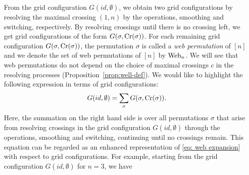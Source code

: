 From the grid configuration $G(id, \emptyset)$, we obtain two grid
configurations by resolving the maximal crossing \( (1,n) \)
by the operations, smoothing and switching, respectively.
By resolving crossings until there is no crossing left,
we get grid configurations of the form $G(\sigma, \operatorname{Cr}(\sigma))$.
For each remaining grid configuration $G(\sigma, \operatorname{Cr}(\sigma))$,
the permutation $\sigma$ is called a \emph{web permutation} of $[n]$ and
we denote the set of web permutations of $[n]$ by $\operatorname{Web}_n$.
We will see that web permutations do not depend on the choice of maximal
crossings \( c \) in the resolving processes (Proposition~\ref{prop:well-def}).
We would like to highlight the following expression in terms of grid configurations:
\begin{equation}\label{Equation: empty grid=sum of grid}
G(id, \emptyset) = \sum_{\sigma} G(\sigma, \operatorname{Cr}(\sigma)).
\end{equation}
Here, the summation on the right hand side is over all permutations $\sigma$ that arise from resolving crossings in the grid configuration $G(id, \emptyset)$ through the operations, smoothing and switching, continuing until no crossings remain. This equation can be regarded as an enhanced representation of \eqref{eq: web expansion} with respect to grid configurations.
For example, starting from the grid configuration $G(id,\emptyset)$ for $n=3$,
we have 
